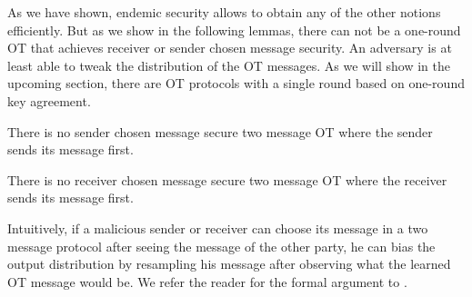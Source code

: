 As we have shown, endemic security allows to obtain any of the other notions efficiently. But as we show in the following lemmas, there can not be a one-round OT that achieves receiver or sender chosen message security. An adversary is at least able to tweak the distribution of the OT messages. As we will show in the upcoming section, there are OT protocols with a single round based on one-round key agreement.

\begin{lemma}\label{lem:nosendtweak}
There is no sender chosen message secure two message OT where the sender sends its message first. 
\end{lemma}


\begin{lemma}\label{lem:norectweak}
There is no receiver chosen message secure two message OT where the receiver sends its message first.
\end{lemma}

Intuitively, if a malicious sender or receiver can choose its message in a two message protocol after seeing the message of the other party, he can bias the output distribution by resampling his message after observing what the learned OT message would be. We refer the reader for the formal argument to 
.